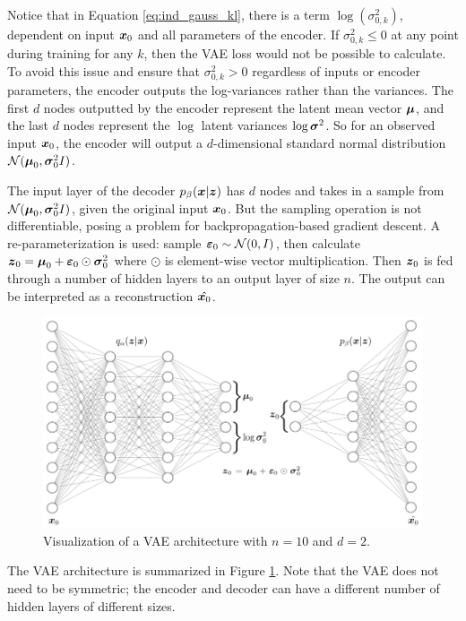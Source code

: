 Notice that in Equation \ref{eq:ind_gauss_kl}, there is a term $\log(\sigma_{0,k}^2)$, dependent on input $\boldsymbol{x}_0$ and all parameters of the encoder. If $\sigma_{0,k}^2 \leq 0$ at any point during training for any $k$, then the VAE loss would not be possible to calculate. To avoid this issue and ensure that $\sigma_{0,k}^2 > 0$ regardless of inputs or encoder parameters, the encoder outputs the log-variances rather than the variances. The first $d$ nodes outputted by the encoder represent the latent mean vector $\boldsymbol{\mu}$, and the last $d$ nodes represent the $\log$ latent variances $\log \boldsymbol{\sigma}^2$. So for an observed input $\boldsymbol{x}_0$, the encoder will output a $d$-dimensional standard normal distribution $\mathcal{N}(\boldsymbol{\mu}_0, \boldsymbol{\sigma}_0^2I)$.

The input layer of the decoder $p_\beta(\boldsymbol{x} | \boldsymbol{z})$ has $d$ nodes and takes in a sample from $\mathcal{N}(\boldsymbol{\mu}_0, \boldsymbol{\sigma}_0^2I)$, given the original input $\boldsymbol{x}_0$. But the sampling operation is not differentiable, posing a problem for backpropagation-based gradient descent. A re-parameterization is used: sample $\boldsymbol{\varepsilon}_0 \sim \mathcal{N}(0,I)$, then calculate $\boldsymbol{z}_0 = \boldsymbol{\mu}_0 + \boldsymbol{\varepsilon}_0 \odot \boldsymbol{\sigma}_0^2$ where $\odot$ is element-wise vector multiplication. Then $\boldsymbol{z}_0$ is fed through a number of hidden layers to an output layer of size $n$. The output can be interpreted as a reconstruction $\hat{\boldsymbol{x}_0}$.

\begin{figure}[h]
  \centering
  \includegraphics[width=.95\textwidth]{img/vae_visual.png}
  \caption{Visualization of a VAE architecture with $n=10$ and $d=2$.}
  \label{fig:vae_visual}
\end{figure}
The VAE architecture is summarized in Figure \ref{fig:vae_visual}. Note that the VAE does not need to be symmetric; the encoder and decoder can have a different number of hidden layers of different sizes.


